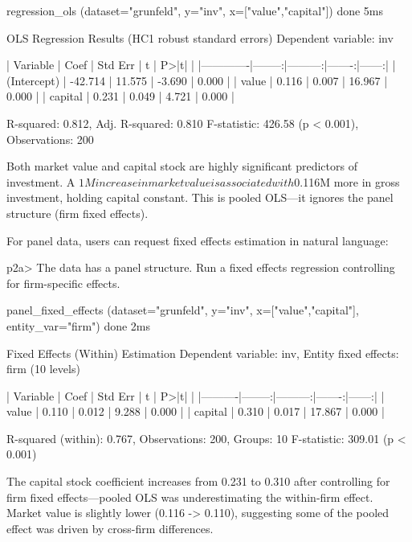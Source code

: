 \begin{Soutput}
  [tool] regression_ols (dataset="grunfeld", y="inv",
           x=["value","capital"])                              done 5ms

OLS Regression Results (HC1 robust standard errors)
Dependent variable: inv

| Variable    |    Coef |  Std Err |      t | P>|t| |
|-------------|--------:|---------:|-------:|------:|
| (Intercept) | -42.714 |   11.575 | -3.690 | 0.000 |
| value       |   0.116 |    0.007 | 16.967 | 0.000 |
| capital     |   0.231 |    0.049 |  4.721 | 0.000 |

R-squared: 0.812,  Adj. R-squared: 0.810
F-statistic: 426.58 (p < 0.001),  Observations: 200

Both market value and capital stock are highly significant predictors of
investment.  A $1M increase in market value is associated with $0.116M
more in gross investment, holding capital constant.
This is pooled OLS---it ignores the panel structure (firm fixed effects).
\end{Soutput}

For panel data, users can request fixed effects estimation in natural language:

\begin{Sinput}
p2a> The data has a panel structure. Run a fixed effects regression
     controlling for firm-specific effects.
\end{Sinput}

\begin{Soutput}
  [tool] panel_fixed_effects (dataset="grunfeld", y="inv",
           x=["value","capital"], entity_var="firm")           done 2ms

Fixed Effects (Within) Estimation
Dependent variable: inv,  Entity fixed effects: firm (10 levels)

| Variable |    Coef |  Std Err |      t | P>|t| |
|----------|--------:|---------:|-------:|------:|
| value    |   0.110 |    0.012 |  9.288 | 0.000 |
| capital  |   0.310 |    0.017 | 17.867 | 0.000 |

R-squared (within): 0.767,  Observations: 200,  Groups: 10
F-statistic: 309.01 (p < 0.001)

The capital stock coefficient increases from 0.231 to 0.310 after
controlling for firm fixed effects---pooled OLS was underestimating the
within-firm effect.  Market value is slightly lower (0.116 -> 0.110),
suggesting some of the pooled effect was driven by cross-firm differences.
\end{Soutput}

